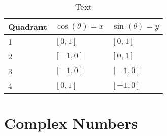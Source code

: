 \begin{table}
	\caption{Text}
	\label{tab:quadrants_trig_vals}
	\centering
	\begin{tabular}{lll}
		\toprule
		Quadrant & $\cos(\theta)=x$ & $\sin(\theta)=y$\\
		\midrule
		\rowcolor{xred!35}1 & $\left[ 0,1 \right]$ & $\left[ 0,1 \right]$\\
		\rowcolor{xblue!35}2 & $\left[-1,0 \right]$ & $\left[ 0,1 \right]$\\
		\rowcolor{xgreen!35}3 & $\left[-1,0 \right]$ & $\left[-1,0 \right]$\\
		\rowcolor{xorange!35}4 & $\left[ 0,1 \right]$ & $\left[-1,0 \right]$\\
		\bottomrule
	\end{tabular}
\end{table}

\section{Complex Numbers}
